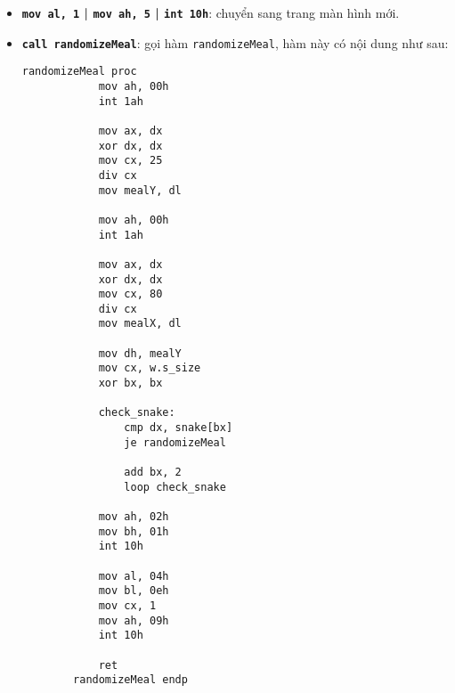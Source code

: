 \begin{itemize}
    \item \textbf{\texttt{mov al, 1} | \texttt{mov ah, 5} | \texttt{int 10h}}: chuyển sang trang màn hình mới.
    \item \textbf{\texttt{call randomizeMeal}}: gọi hàm \texttt{randomizeMeal}, hàm này có nội dung như sau:
    
    \vspace{0.3cm}
    \begin{lstlisting}[style=asm]
        randomizeMeal proc
            mov ah, 00h  
            int 1ah      
                
            mov ax, dx     
            xor dx, dx     
            mov cx, 25      
            div cx         
            mov mealY, dl   
                
            mov ah, 00h    
            int 1ah 
                
            mov ax, dx      
            xor dx, dx
            mov cx, 80       
            div cx
            mov mealX, dl    
                
            mov dh, mealY      
            mov cx, w.s_size    
            xor bx, bx          
            
            check_snake:
                cmp dx, snake[bx]     
                je randomizeMeal      
                    
                add bx, 2             
                loop check_snake      
                
            mov ah, 02h         
            mov bh, 01h         
            int 10h
                
            mov al, 04h        
            mov bl, 0eh        
            mov cx, 1         
            mov ah, 09h        
            int 10h 
                
            ret
        randomizeMeal endp                              
    \end{lstlisting}
    \vspace{0.3cm}


\end{itemize}
